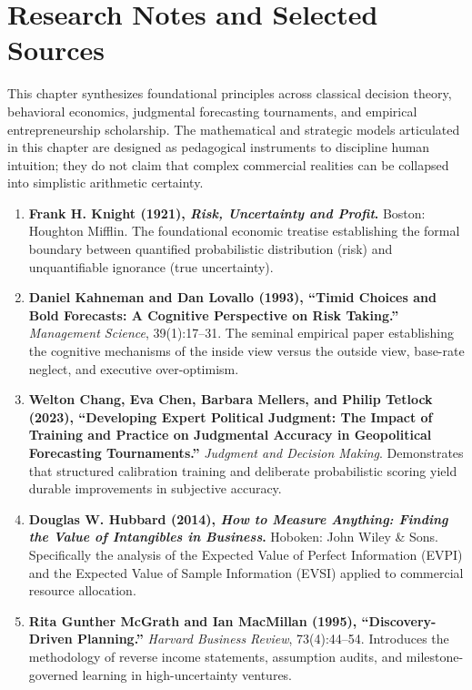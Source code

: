 \section{Research Notes and Selected Sources}

This chapter synthesizes foundational principles across classical decision theory, behavioral economics, judgmental forecasting tournaments, and empirical entrepreneurship scholarship. The mathematical and strategic models articulated in this chapter are designed as pedagogical instruments to discipline human intuition; they do not claim that complex commercial realities can be collapsed into simplistic arithmetic certainty.

\begin{enumerate}[leftmargin=14pt,itemsep=3pt,topsep=2pt,parsep=0pt]
  \item \textbf{Frank H. Knight (1921), \textit{Risk, Uncertainty and Profit}.} Boston: Houghton Mifflin. The foundational economic treatise establishing the formal boundary between quantified probabilistic distribution (risk) and unquantifiable ignorance (true uncertainty).

  \item \textbf{Daniel Kahneman and Dan Lovallo (1993), ``Timid Choices and Bold Forecasts: A Cognitive Perspective on Risk Taking.''} \textit{Management Science}, 39(1):17--31. The seminal empirical paper establishing the cognitive mechanisms of the inside view versus the outside view, base-rate neglect, and executive over-optimism.

  \item \textbf{Welton Chang, Eva Chen, Barbara Mellers, and Philip Tetlock (2023), ``Developing Expert Political Judgment: The Impact of Training and Practice on Judgmental Accuracy in Geopolitical Forecasting Tournaments.''} \textit{Judgment and Decision Making}. Demonstrates that structured calibration training and deliberate probabilistic scoring yield durable improvements in subjective accuracy.

  \item \textbf{Douglas W. Hubbard (2014), \textit{How to Measure Anything: Finding the Value of Intangibles in Business}.} Hoboken: John Wiley \& Sons. Specifically the analysis of the Expected Value of Perfect Information (EVPI) and the Expected Value of Sample Information (EVSI) applied to commercial resource allocation.

  \item \textbf{Rita Gunther McGrath and Ian MacMillan (1995), ``Discovery-Driven Planning.''} \textit{Harvard Business Review}, 73(4):44--54. Introduces the methodology of reverse income statements, assumption audits, and milestone-governed learning in high-uncertainty ventures.


\end{enumerate}
